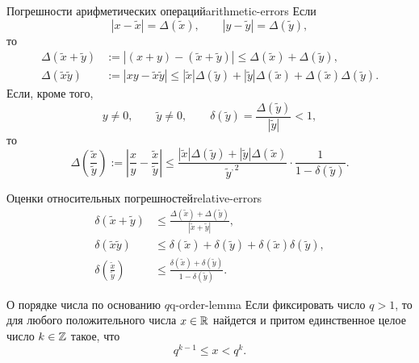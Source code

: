\begin{proposition}{Погрешности арифметических операций}{arithmetic-errors}
  Если
  \[
    |x-\widetilde{x}|=\Delta(\widetilde{x}),
    \qquad
    |y-\widetilde{y}|=\Delta(\widetilde{y}),
  \]
  то
  \begin{align}
    \Delta(\widetilde{x}+\widetilde{y})
      &:=|(x+y)-(\widetilde{x}+\widetilde{y})|
        \le\Delta(\widetilde{x})+\Delta(\widetilde{y}),\label{eq:error-sum}\\
    \Delta(\widetilde{x}\widetilde{y})
      &:=|xy-\widetilde{x}\widetilde{y}|
        \le|\widetilde{x}|\Delta(\widetilde{y})
          +|\widetilde{y}|\Delta(\widetilde{x})
          +\Delta(\widetilde{x})\Delta(\widetilde{y}).\label{eq:error-product}
  \end{align}
  Если, кроме того,
  \[
    y\ne0,\qquad \widetilde{y}\ne0,
    \qquad
    \delta(\widetilde{y})=
      \frac{\Delta(\widetilde{y})}{|\widetilde{y}|}<1,
  \]
  то
  \begin{equation}
    \Delta\!\left(\frac{\widetilde{x}}{\widetilde{y}}\right)
      :=\left|\frac{x}{y}-\frac{\widetilde{x}}{\widetilde{y}}\right|
      \le
      \frac{|\widetilde{x}|\Delta(\widetilde{y})
        +|\widetilde{y}|\Delta(\widetilde{x})}{\widetilde{y}^{,2}}
      \cdot\frac{1}{1-\delta(\widetilde{y})}.
    \label{eq:error-quotient}
  \end{equation}
\end{proposition}

\begin{properties}{Оценки относительных погрешностей}{relative-errors}
  \begin{align}
    \delta(\widetilde{x}+\widetilde{y})
      &\le\frac{\Delta(\widetilde{x})+\Delta(\widetilde{y})}
        {|\widetilde{x}+\widetilde{y}|},\label{eq:relative-sum}\\
    \delta(\widetilde{x}\widetilde{y})
      &\le\delta(\widetilde{x})+\delta(\widetilde{y})
        +\delta(\widetilde{x})\delta(\widetilde{y}),\label{eq:relative-product}\\
    \delta\!\left(\frac{\widetilde{x}}{\widetilde{y}}\right)
      &\le\frac{\delta(\widetilde{x})+\delta(\widetilde{y})}
        {1-\delta(\widetilde{y})}.
    \label{eq:relative-quotient}
  \end{align}
\end{properties}

\begin{lemma}{О порядке числа по основанию $q$}{q-order-lemma}
  Если фиксировать число $q>1$, то для любого положительного числа
  $x\in\mathbb{R}$ найдется и притом единственное целое число $k\in\mathbb{Z}$ такое, что
  \[
    q^{k-1}\le x<q^k.
  \]
\end{lemma}

